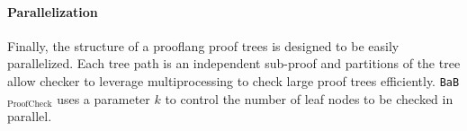 \documentclass[oneside,11pt,dvipsnames]{book}
\numberwithin{equation}{section}
\theoremstyle{definition}
\theoremstyle{remark}
\newcommand{\hd}[1]{\iftoggle{usecomment}{{\color{blue}{[HD]: #1}}}{}}
\newcommand{\proofcheck}{\texttt{BaB$_{\text{ProofCheck}}$}}
\begin{document}



\paragraph{Parallelization} Finally, the structure of a prooflang{} proof trees is designed to be easily parallelized.  Each tree path is an independent sub-proof and partitions of the tree allow checker to leverage multiprocessing to check large proof trees efficiently. \proofcheck{} uses a parameter $k$ to control the number of leaf nodes to be checked in parallel.
\end{document}
